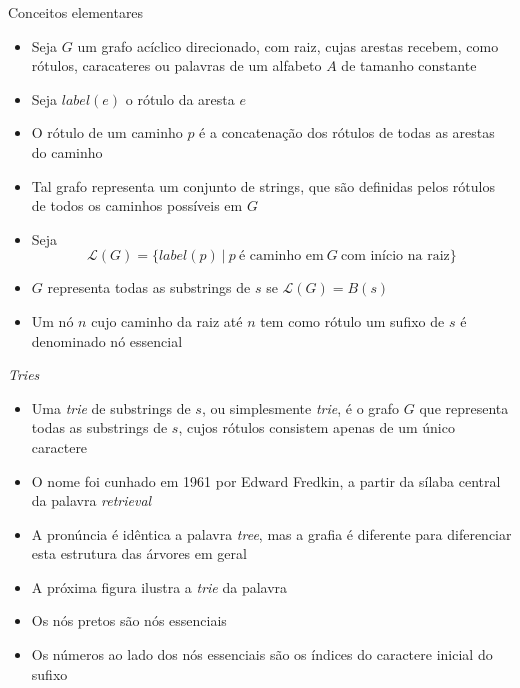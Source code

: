 \begin{frame}[fragile]{Conceitos elementares}

    \begin{itemize}
        \item Seja $G$ um grafo acíclico direcionado, com raiz, cujas arestas recebem, como 
            rótulos, caracateres ou palavras de um alfabeto $A$ de tamanho constante

        \item Seja $label(e)$ o rótulo da aresta $e$

        \item O rótulo de um caminho $p$ é a concatenação dos rótulos de todas as arestas do 
            caminho

        \item Tal grafo representa um conjunto de strings, que são definidas pelos rótulos de 
            todos os caminhos possíveis em $G$

        \item Seja
        \[
            \mathcal{L}(G) = \lbrace label(p)\ |\ p \ \mbox{é caminho em}\ G \ \mbox{com início na raiz}
            \rbrace
        \]

        \item $G$ representa todas as substrings de $s$ se $\mathcal{L}(G) = B(s)$

        \item Um nó $n$ cujo caminho da raiz até $n$ tem como rótulo um sufixo de $s$ é 
            denominado nó essencial
    \end{itemize}

\end{frame}


\begin{frame}[fragile]{\it Tries}

    \begin{itemize}
        \item Uma {\it trie} de substrings de $s$, ou simplesmente {\it trie}, é o grafo $G$ que 
            representa todas as substrings de $s$, cujos rótulos consistem apenas de um único 
            caractere

        \item O nome foi cunhado em 1961 por Edward Fredkin, a partir da sílaba central da palavra
            \textit{retrieval}

        \item A pronúncia é idêntica a palavra \textit{tree}, mas a grafia é diferente para 
            diferenciar esta estrutura das árvores em geral

        \item A próxima figura ilustra a \textit{trie} da palavra 

        \item Os nós pretos são nós essenciais

        \item Os números ao lado dos nós essenciais são os índices do caractere inicial do sufixo

    \end{itemize}

\end{frame}

